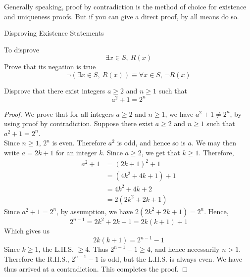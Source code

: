\vspace*{1em}

\begin{remark}
Generally speaking, proof by contradiction is the method of choice for existence and uniqueness proofs. But if you can give a direct proof, by all means do so.
\end{remark}

\vspace*{2em}

\begin{mdframed}
\begin{center}
{\Large Disproving Existence Statements}
\end{center}
\end{mdframed}

\begin{discussion}
To disprove
\[\exists x \in S,\ R(x)\]
Prove that its negation is true
\[\neg(\exists x \in S,\ R(x)) \equiv \forall x \in S,\ \neg R(x)\]
\end{discussion}

\vspace*{1em}

\begin{example}
Disprove that there exist integers $a \geq 2$ and $n \geq 1$ such that
\[a^2 + 1 = 2^n\]
\end{example}
\begin{proof}
We prove that for all integers $a \geq 2$ and $n \geq 1$, we have $a^2 + 1 \neq 2^n$, by using proof by contradiction. Suppose there exist $a \geq 2$ and $n \geq 1$ such that $a^2 + 1 = 2^n$.\\[0.5em]
Since $n \geq 1$, $2^n$ is even. Therefore $a^2$ is odd, and hence so is $a$. We may then write $a = 2k + 1$ for an integer $k$. Since $a \geq 2$, we get that $k \geq 1$. Therefore,
\begin{align*}
a^2 + 1 &= (2k + 1)^2 + 1\\[0.5em]
&= (4k^2 + 4k + 1) + 1\\[0.5em]
&= 4k^2 + 4k + 2\\[0.5em]
&= 2(2k^2 + 2k + 1)
\end{align*}
Since $a^2 + 1 = 2^n$, by assumption, we have $2(2k^2 + 2k + 1) = 2^n$. Hence,
\[2^{n-1} = 2k^2 + 2k + 1 = 2k(k+1) + 1\]
Which gives us
\[2k(k + 1) = 2^{n-1} - 1\]
Since $k \geq 1$, the L.H.S. $\geq 4$. Thus $2^{n-1} - 1 \geq 4$, and hence necessarily $n > 1$. Therefore the R.H.S., $2^{n - 1} - 1$ is odd, but the L.H.S. is always even. We have thus arrived at a contradiction. This completes the proof.
\end{proof}